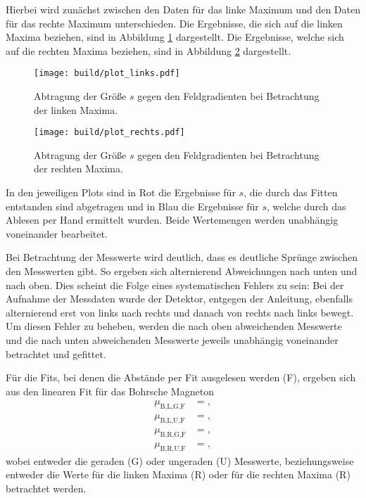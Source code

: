 Hierbei wird zunächst zwischen den Daten für das linke Maximum und den Daten für das rechte Maximum unterschieden.
Die Ergebnisse, die sich auf die linken Maxima beziehen, sind in Abbildung \ref{fig:plotlinks} dargestellt. Die Ergebnisse, welche sich auf die rechten Maxima beziehen, sind in Abbildung \ref{fig:plotrechts} dargestellt.
\begin{figure}
  \centering
  \texttt{[image: build/plot\_links.pdf]}
  \caption{Abtragung der Größe $s$ gegen den Feldgradienten bei Betrachtung der linken Maxima.}
  \label{fig:plotlinks}
\end{figure}

\begin{figure}
  \centering
  \texttt{[image: build/plot\_rechts.pdf]}
  \caption{Abtragung der Größe $s$ gegen den Feldgradienten bei Betrachtung der rechten Maxima.}
  \label{fig:plotrechts}
\end{figure}

In den jeweiligen Plots sind in Rot die Ergebnisse für $s$, die durch das Fitten entstanden sind abgetragen und in Blau die Ergebnisse für $s$, welche durch das Ablesen per Hand ermittelt wurden.
Beide Wertemengen werden unabhängig voneinander bearbeitet.

Bei Betrachtung der Messwerte wird deutlich, dass es deutliche Sprünge zwischen den Messwerten gibt.
So ergeben sich alternierend Abweichungen nach unten und nach oben.
Dies scheint die Folge eines systematischen Fehlers zu sein: Bei der Aufnahme der Messdaten wurde der Detektor, entgegen der Anleitung, ebenfalls alternierend erst von links nach rechts und danach von rechts nach links bewegt.
Um diesen Fehler zu beheben, werden die nach oben abweichenden Messwerte und die nach unten abweichenden Messwerte jeweils unabhängig voneinander betrachtet und gefittet.

Für die Fits, bei denen die Abstände per Fit ausgelesen werden (F), ergeben sich aus den linearen Fit für das Bohrsche Magneton
\begin{align*}
  \mu_{\text{B,L,G,F}} &= ,\\
  \mu_{\text{B,L,U,F}} &= ,\\
  \mu_{\text{B,R,G,F}} &= ,\\
  \mu_{\text{B,R,U,F}} &= ,
\end{align*}
wobei entweder die geraden (G) oder ungeraden (U) Messwerte, beziehungsweise entweder die Werte für die linken Maxima (R) oder für die rechten Maxima (R) betrachtet werden.

